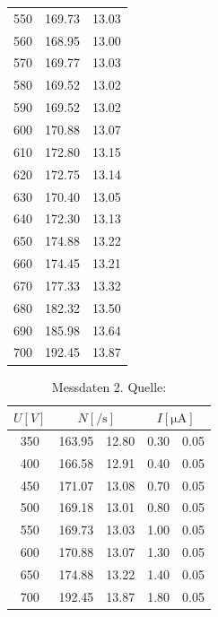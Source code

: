 \begin{table}[H]
\begin{tabular}{c c @{${}\pm{}$} c}
          550 &  169.73 &  13.03\\
          560 &  168.95 &  13.00\\
          570 &  169.77 &  13.03\\
          580 &  169.52 &  13.02\\
          590 &  169.52 &  13.02\\
          600 &  170.88 &  13.07\\
          610 &  172.80 &  13.15\\
          620 &  172.75 &  13.14\\
          630 &  170.40 &  13.05\\
          640 &  172.30 &  13.13\\
          650 &  174.88 &  13.22\\
          660 &  174.45 &  13.21\\
          670 &  177.33 &  13.32\\
          680 &  182.32 &  13.50\\
          690 &  185.98 &  13.64\\
          700 &  192.45 &  13.87\\
          \bottomrule
        \end{tabular}
      \end{table}

\begin{table}[H]
  \centering
      \caption{Messdaten 2. Quelle:\cite{AP02}}
      \label{tab:mess2}
      \begin{tabular}{c c @{${}\pm{}$} c c @{${}\pm{}$} c}
        \toprule
        {$U [\si{V}]$} & 
        \multicolumn{2}{c}{$N [\si{\per\second}]$}  & 
        \multicolumn{2}{c}{$I [\si{\micro\ampere}]$}\\
        \midrule
        350 & 163.95 & 12.80 & 0.30 & 0.05\\
        400 & 166.58 & 12.91 & 0.40 & 0.05\\
        450 & 171.07 & 13.08 & 0.70 & 0.05\\
        500 & 169.18 & 13.01 & 0.80 & 0.05\\
        550 & 169.73 & 13.03 & 1.00 & 0.05\\
        600 & 170.88 & 13.07 & 1.30 & 0.05\\
        650 & 174.88 & 13.22 & 1.40 & 0.05\\
        700 & 192.45 & 13.87 & 1.80 & 0.05\\
        \bottomrule
      \end{tabular}
    \end{table}
    
